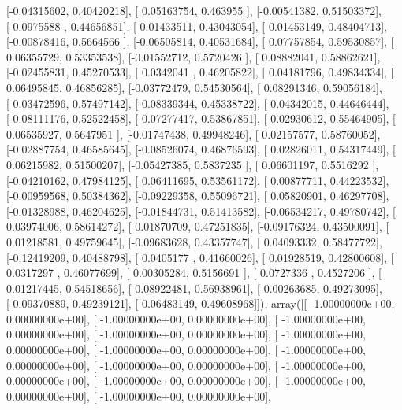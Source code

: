 \documentclass{article}
\begin{document}
       [-0.04315602,  0.40420218],
       [ 0.05163754,  0.463955  ],
       [-0.00541382,  0.51503372],
       [-0.0975588 ,  0.44656851],
       [ 0.01433511,  0.43043054],
       [ 0.01453149,  0.48404713],
       [-0.00878416,  0.5664566 ],
       [-0.06505814,  0.40531684],
       [ 0.07757854,  0.59530857],
       [ 0.06355729,  0.53353538],
       [-0.01552712,  0.5720426 ],
       [ 0.08882041,  0.58862621],
       [-0.02455831,  0.45270533],
       [ 0.0342041 ,  0.46205822],
       [ 0.04181796,  0.49834334],
       [ 0.06495845,  0.46856285],
       [-0.03772479,  0.54530564],
       [ 0.08291346,  0.59056184],
       [-0.03472596,  0.57497142],
       [-0.08339344,  0.45338722],
       [-0.04342015,  0.44646444],
       [-0.08111176,  0.52522458],
       [ 0.07277417,  0.53867851],
       [ 0.02930612,  0.55464905],
       [ 0.06535927,  0.5647951 ],
       [-0.01747438,  0.49948246],
       [ 0.02157577,  0.58760052],
       [-0.02887754,  0.46585645],
       [-0.08526074,  0.46876593],
       [ 0.02826011,  0.54317449],
       [ 0.06215982,  0.51500207],
       [-0.05427385,  0.5837235 ],
       [ 0.06601197,  0.5516292 ],
       [-0.04210162,  0.47984125],
       [ 0.06411695,  0.53561172],
       [ 0.00877711,  0.44223532],
       [-0.00959568,  0.50384362],
       [-0.09229358,  0.55096721],
       [ 0.05820901,  0.46297708],
       [-0.01328988,  0.46204625],
       [-0.01844731,  0.51413582],
       [-0.06534217,  0.49780742],
       [ 0.03974006,  0.58614272],
       [ 0.01870709,  0.47251835],
       [-0.09176324,  0.43500091],
       [ 0.01218581,  0.49759645],
       [-0.09683628,  0.43357747],
       [ 0.04093332,  0.58477722],
       [-0.12419209,  0.40488798],
       [ 0.0405177 ,  0.41660026],
       [ 0.01928519,  0.42800608],
       [ 0.0317297 ,  0.46077699],
       [ 0.00305284,  0.5156691 ],
       [ 0.0727336 ,  0.4527206 ],
       [ 0.01217445,  0.54518656],
       [ 0.08922481,  0.56938961],
       [-0.00263685,  0.49273095],
       [-0.09370889,  0.49239121],
       [ 0.06483149,  0.49608968]]), array([[ -1.00000000e+00,   0.00000000e+00],
       [ -1.00000000e+00,   0.00000000e+00],
       [ -1.00000000e+00,   0.00000000e+00],
       [ -1.00000000e+00,   0.00000000e+00],
       [ -1.00000000e+00,   0.00000000e+00],
       [ -1.00000000e+00,   0.00000000e+00],
       [ -1.00000000e+00,   0.00000000e+00],
       [ -1.00000000e+00,   0.00000000e+00],
       [ -1.00000000e+00,   0.00000000e+00],
       [ -1.00000000e+00,   0.00000000e+00],
       [ -1.00000000e+00,   0.00000000e+00],
       [ -1.00000000e+00,   0.00000000e+00],
\end{document}
